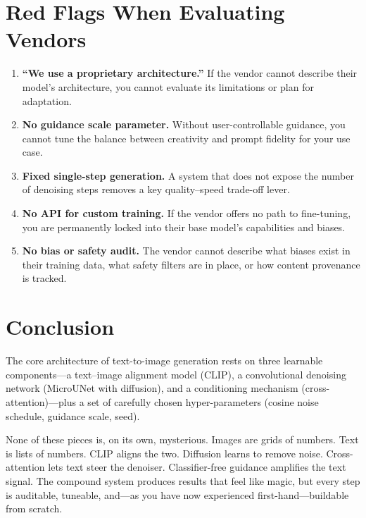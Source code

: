 \documentclass[11pt,a4paper]{article}
\begin{document}
\section{Red Flags When Evaluating Vendors}
\label{sec:redflags}

\begin{enumerate}
  \item \textbf{``We use a proprietary architecture.''}  If the vendor
        cannot describe their model's architecture, you cannot evaluate
        its limitations or plan for adaptation.
  \item \textbf{No guidance scale parameter.}  Without user-controllable
        guidance, you cannot tune the balance between creativity and
        prompt fidelity for your use case.
  \item \textbf{Fixed single-step generation.}  A system that does not
        expose the number of denoising steps removes a key quality--speed
        trade-off lever.
  \item \textbf{No API for custom training.}  If the vendor offers no
        path to fine-tuning, you are permanently locked into their base
        model's capabilities and biases.
  \item \textbf{No bias or safety audit.}  The vendor cannot describe
        what biases exist in their training data, what safety filters are
        in place, or how content provenance is tracked.
\end{enumerate}


\section{Conclusion}
\label{sec:conclusion}

The core architecture of text-to-image generation rests on three
learnable components---a text--image alignment model (CLIP), a
convolutional denoising network (MicroUNet with diffusion), and a
conditioning mechanism (cross-attention)---plus a set of carefully chosen
hyper-parameters (cosine noise schedule, guidance scale, seed).

None of these pieces is, on its own, mysterious.  Images are grids of
numbers.  Text is lists of numbers.  CLIP aligns the two.  Diffusion
learns to remove noise.  Cross-attention lets text steer the denoiser.
Classifier-free guidance amplifies the text signal.  The compound system
produces results that feel like magic, but every step is auditable,
tuneable, and---as you have now experienced first-hand---buildable from
scratch.
\end{document}
